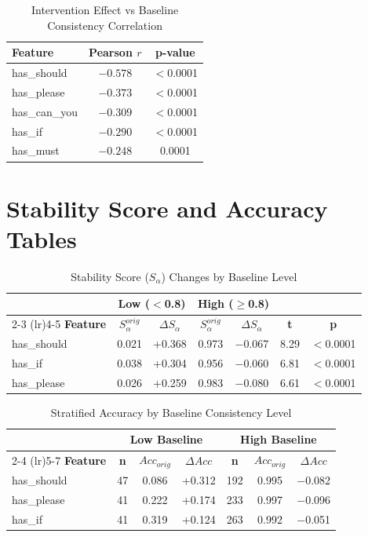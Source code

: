\documentclass[sigconf,anonymous,review]{acmart}
\begin{document}
\begin{table}[h]
\centering
\caption{Intervention Effect vs Baseline Consistency Correlation}
\small
\begin{tabular}{@{}lcc@{}}
\toprule
\textbf{Feature} & \textbf{Pearson $r$} & \textbf{p-value} \\
\midrule
has\_should & $-0.578$ & $<$0.0001 \\
has\_please & $-0.373$ & $<$0.0001 \\
has\_can\_you & $-0.309$ & $<$0.0001 \\
has\_if & $-0.290$ & $<$0.0001 \\
has\_must & $-0.248$ & 0.0001 \\
\bottomrule
\end{tabular}
\end{table}

\section{Stability Score and Accuracy Tables}
\label{app:stability}

\begin{table}[h]
\centering
\caption{Stability Score ($S_\alpha$) Changes by Baseline Level}
\small
\begin{tabular}{@{}lcccccc@{}}
\toprule
& \multicolumn{2}{c}{\textbf{Low ($<$0.8)}} & \multicolumn{2}{c}{\textbf{High ($\geq$0.8)}} & & \\
\cmidrule(lr){2-3} \cmidrule(lr){4-5}
\textbf{Feature} & \textbf{$S_\alpha^{orig}$} & \textbf{$\Delta S_\alpha$} & \textbf{$S_\alpha^{orig}$} & \textbf{$\Delta S_\alpha$} & \textbf{t} & \textbf{p} \\
\midrule
has\_should & 0.021 & +0.368 & 0.973 & $-$0.067 & 8.29 & $<$0.0001 \\
has\_if & 0.038 & +0.304 & 0.956 & $-$0.060 & 6.81 & $<$0.0001 \\
has\_please & 0.026 & +0.259 & 0.983 & $-$0.080 & 6.61 & $<$0.0001 \\
\bottomrule
\end{tabular}
\end{table}

\begin{table}[h]
\centering
\caption{Stratified Accuracy by Baseline Consistency Level}
\small
\begin{tabular}{@{}lcccccc@{}}
\toprule
& \multicolumn{3}{c}{\textbf{Low Baseline}} & \multicolumn{3}{c}{\textbf{High Baseline}} \\
\cmidrule(lr){2-4} \cmidrule(lr){5-7}
\textbf{Feature} & \textbf{n} & \textbf{$Acc_{orig}$} & \textbf{$\Delta Acc$} & \textbf{n} & \textbf{$Acc_{orig}$} & \textbf{$\Delta Acc$} \\
\midrule
has\_should & 47 & 0.086 & +0.312 & 192 & 0.995 & $-$0.082 \\
has\_please & 41 & 0.222 & +0.174 & 233 & 0.997 & $-$0.096 \\
has\_if & 41 & 0.319 & +0.124 & 263 & 0.992 & $-$0.051 \\
\bottomrule
\end{tabular}
\end{table}
\end{document}
